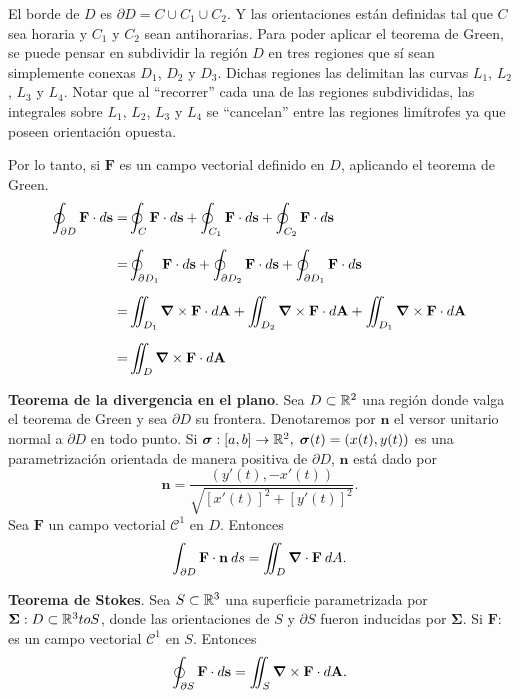 \begin{obs}
    El borde de $D$ es $\partial D=C\cup C_1\cup C_2$. Y las orientaciones est\'an definidas tal que $C$ sea horaria y $C_1$ y $C_2$ sean antihorarias. Para poder aplicar el teorema de Green, se puede pensar en subdividir la regi\'on $D$ en tres regiones que s\'i sean simplemente conexas $D_1$, $D_2$ y $D_3$. Dichas regiones las delimitan las curvas $L_1$, $L_2$, $L_3$ y $L_4$. Notar que al ``recorrer'' cada una de las regiones subdivididas, las integrales sobre $L_1$, $L_2$, $L_3$ y $L_4$ se ``cancelan'' entre las regiones lim\'itrofes ya que poseen orientación opuesta. 
    
    Por lo tanto, si $\mathbf{F}$ es un campo vectorial definido en $D$, aplicando el teorema de Green.
    \begin{align*}
        \oint_{\partial D} \mathbf{F}\cdot d\mathbf{s}=&\oint_{C}\mathbf{F}\cdot d\mathbf{s}+\oint_{C_1}\mathbf{F}\cdot d\mathbf{s}+\oint_{C_2}\mathbf{F}\cdot d\mathbf{s}\\[.2cm]
        =&\oint_{\partial D_1}\mathbf{F}\cdot d\mathbf{s}+\oint_{\partial D_2}\mathbf{F}\cdot d\mathbf{s}+\oint_{\partial D_1}\mathbf{F}\cdot d\mathbf{s}\\[.2cm]
        =&\iint_{ D_1}\grad\times\mathbf{F}\cdot d\mathbf{A}+\iint_{ D_2}\grad\times\mathbf{F}\cdot d\mathbf{A}+\iint_{ D_1}\grad\times\mathbf{F}\cdot d\mathbf{A}\\[.2cm]
        =&\iint_D \grad\times\mathbf{F}\cdot d\mathbf{A}
    \end{align*}

\end{obs}

\begin{theorem}
\textbf{Teorema de la divergencia en el plano}. Sea $D\subset\mathbb{R}^2$ una regi\'on donde valga el teorema de Green y sea $\partial D$ su frontera. Denotaremos por $\mathbf{n}$ el versor unitario normal a $\partial D$ en todo punto. Si $\boldsymbol{\sigma}:[a,b]\to\mathbb{R}^2,\;\boldsymbol{\sigma}(t)=(x(t),y(t))$ es una parametrizaci\'on orientada de manera positiva de $\partial D$, $\mathbf{n}$ est\'a dado por 
\[
    \mathbf{n}=\frac{(y'(t),-x'(t))}{\sqrt{[x'(t)]^2+[y'(t)]^2}}.
\]
Sea $\mathbf{F}$ un campo vectorial $\mathcal{C}^1$ en $D$. Entonces
\[
    \int_{\partial D}\mathbf{F}\cdot\mathbf{n}\:ds=\iint_D\grad\cdot\mathbf{F}\:dA.
\]
\end{theorem}

\begin{theorem}
\textbf{Teorema de Stokes}. Sea $S\subset\mathbb{R}^3$ una superficie parametrizada por $\boldsymbol{\Sigma}:D\subset\mathbb{R}^3to S$, donde las orientaciones de $S$ y $\partial S$ fueron inducidas por $\boldsymbol{\Sigma}$. Si $\mathbf{F}:$ es un campo vectorial $\mathcal{C}^1$ en $S$. Entonces
\[
    \oint_{\partial S}\mathbf{F}\cdot d\mathbf{s}=\iint_S\grad\times\mathbf{F}\cdot d\mathbf{A}.
\]
\end{theorem}

